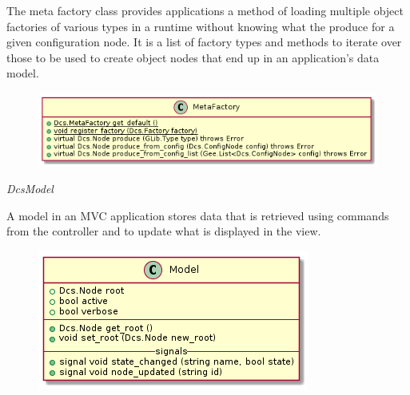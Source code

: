       \vspace*{-0.75cm}
      \begin{minipage}[t]{0.5\textwidth}
        \vspace*{0.5cm}
        The meta factory class provides applications a method of loading
        multiple object factories of various types in a runtime without knowing
        what the produce for a given configuration node. It is a list of factory
        types and methods to iterate over those to be used to create object
        nodes that end up in an application's data model.
      \end{minipage} \hfill
      \begin{minipage}[t]{0.45\textwidth}
        \begin{figure}[H]
          \includegraphics[width=\textwidth]{figures/design/class/core/meta-factory}
          \label{fig:dsg-classes-meta-factory}
        \end{figure}
      \end{minipage}

      \emph{DcsModel}

      \vspace*{-0.75cm}
      \begin{minipage}[t]{0.5\textwidth}
        \vspace*{0.5cm}
        A model in an MVC application stores data that is retrieved using
        commands from the controller and to update what is displayed in the
        view.
      \end{minipage} \hfill
      \begin{minipage}[t]{0.45\textwidth}
        \begin{figure}[H]
          \includegraphics[width=\textwidth]{figures/design/class/core/model}
          \label{fig:dsg-classes-model}
        \end{figure}
      \end{minipage}

